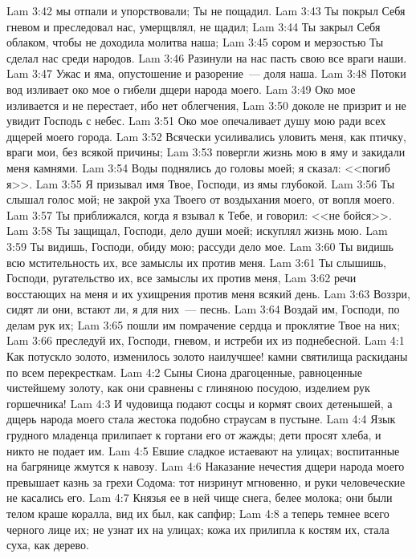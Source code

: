 \vs Lam 3:42 мы отпали и упорствовали; Ты не пощадил.
\vs Lam 3:43 Ты покрыл Себя гневом и преследовал нас, умерщвлял, не щадил;
\vs Lam 3:44 Ты закрыл Себя облаком, чтобы не доходила молитва наша;
\vs Lam 3:45 сором и мерзостью Ты сделал нас среди народов.
\vs Lam 3:46 Разинули на нас пасть свою все враги наши.
\vs Lam 3:47 Ужас и яма, опустошение и разорение~--- доля наша.
\vs Lam 3:48 Потоки вод изливает око мое о гибели дщери народа моего.
\vs Lam 3:49 Око мое изливается и не перестает, ибо нет облегчения,
\vs Lam 3:50 доколе не призрит и не увидит Господь с небес.
\vs Lam 3:51 Око мое опечаливает душу мою ради всех дщерей моего города.
\vs Lam 3:52 Всячески усиливались уловить меня, как птичку, враги мои, без всякой причины;
\vs Lam 3:53 повергли жизнь мою в яму и закидали меня камнями.
\vs Lam 3:54 Воды поднялись до головы моей; я сказал: <<погиб я>>.
\vs Lam 3:55 Я призывал имя Твое, Господи, из ямы глубокой.
\vs Lam 3:56 Ты слышал голос мой; не закрой уха Твоего от воздыхания моего, от вопля моего.
\vs Lam 3:57 Ты приближался, когда я взывал к Тебе, и говорил: <<не бойся>>.
\vs Lam 3:58 Ты защищал, Господи, дело души моей; искуплял жизнь мою.
\vs Lam 3:59 Ты видишь, Господи, обиду мою; рассуди дело мое.
\vs Lam 3:60 Ты видишь всю мстительность их, все замыслы их против меня.
\vs Lam 3:61 Ты слышишь, Господи, ругательство их, все замыслы их против меня,
\vs Lam 3:62 речи восстающих на меня и их ухищрения против меня всякий день.
\vs Lam 3:63 Воззри, сидят ли они, встают ли, я для них~--- песнь.
\vs Lam 3:64 Воздай им, Господи, по делам рук их;
\vs Lam 3:65 пошли им помрачение сердца и проклятие Твое на них;
\vs Lam 3:66 преследуй их, Господи, гневом, и истреби их из поднебесной.
\vs Lam 4:1 Как потускло золото, изменилось золото наилучшее! камни святилища раскиданы по всем перекресткам.
\vs Lam 4:2 Сыны Сиона драгоценные, равноценные чистейшему золоту, как они сравнены с глиняною посудою, изделием рук горшечника!
\vs Lam 4:3 И чудовища подают сосцы и кормят своих детенышей, а дщерь народа моего стала жестока подобно страусам в пустыне.
\vs Lam 4:4 Язык грудного младенца прилипает к гортани его от жажды; дети просят хлеба, и никто не подает им.
\vs Lam 4:5 Евшие сладкое истаевают на улицах; воспитанные на багрянице жмутся к навозу.
\vs Lam 4:6 Наказание нечестия дщери народа моего превышает казнь за грехи Содома: тот низринут мгновенно, и руки человеческие не касались его.
\vs Lam 4:7 Князья ее  в ней чище снега, белее молока; они были телом краше коралла, вид их был, как сапфир;
\vs Lam 4:8 а теперь темнее всего черного лице их; не узнат их на улицах; кожа их прилипла к костям их, стала суха, как дерево.
